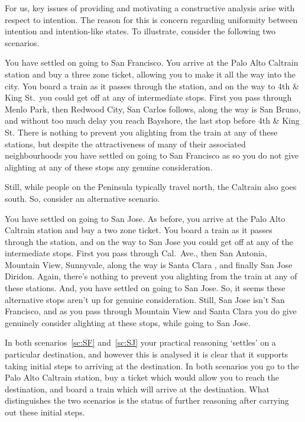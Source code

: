 \documentclass[10pt]{article}
\begin{document}
For us, key issues of providing and motivating a constructive analysis arise with respect to intention.
The reason for this is concern regarding uniformity between intention and intention-like states.
To illustrate, consider the following two scenarios.

\begin{scenario}\label{sc:SF}
  You have settled on going to San Francisco.
  You arrive at the Palo Alto Caltrain station and buy a three zone ticket, allowing you to make it all the way into the city.
  You board a train as it passes through the station, and on the way to 4th \& King St.\ you could get off at any of intermediate stops.
  First you pass through Menlo Park, then Redwood City, San Carlos follows, along the way is San Bruno, and without too much delay you reach Bayshore, the last stop before 4th \& King St.
  There is nothing to prevent you alighting from the train at any of these stations, but despite the attractiveness of many of their associated neighbourhoods you have settled on going to San Francisco as so you do not give alighting at any of these stops any genuine consideration.
\end{scenario}

Still, while people on the Peninsula typically travel north, the Caltrain also goes south.
So, consider an alternative scenario.

\begin{scenario}\label{sc:SJ}
  You have settled on going to San Jose.
  As before, you arrive at the Palo Alto Caltrain station and buy a two zone ticket.
  You board a train as it passes through the station, and on the way to San Jose you could get off at any of the intermediate stops.
  First you pass through Cal.\ Ave., then San Antonia, Mountain View, Sunnyvale, along the way is Santa Clara , and finally San Jose Diridon.
  Again, there's nothing to prevent you alighting from the train at any of these stations.
  And, you have settled on going to San Jose.
  So, it seems these alternative stops aren't up for genuine consideration.
  Still, San Jose isn't San Francisco, and as you pass through Mountain View and Santa Clara you do give genuinely consider alighting at these stops, while going to San Jose.
\end{scenario}

In both scenarios~\ref{sc:SF} and~\ref{sc:SJ} your practical reasoning `settles' on a particular destination, and however this is analysed it is clear that it supports taking initial steps to arriving at the destination.
In both scenarios you go to the Palo Alto Caltrain station, buy a ticket which would allow you to reach the destination, and board a train which will arrive at the destination.
What distinguishes the two scenarios is the status of further reasoning after carrying out these initial steps.
\end{document}
